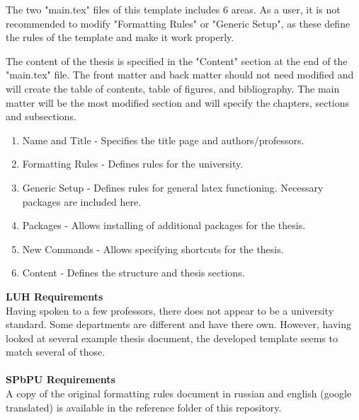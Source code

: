 \label{chap:guidelines}
The two "main.tex" files of this template includes 6 areas. As a user, it is not recommended to modify "Formatting Rules" or "Generic Setup", as these define the rules of the template and make it work properly.

The content of the thesis is specified in the "Content" section at the end of the "main.tex" file. The front matter and back matter should not need modified and will create the table of contents, table of figures, and bibliography. The main matter will be the most modified section and will specify the chapters, sections and subsections.

\begin{enumerate}
    \item Name and Title - Specifies the title page and authors/professors.
    \item Formatting Rules - Defines rules for the university.
    \item Generic Setup - Defines rules for general latex functioning. Necessary packages are included here.
    \item Packages - Allows installing of additional packages for the thesis.
    \item New Commands - Allows specifying shortcuts for the thesis.
    \item Content - Defines the structure and thesis sections.
\end{enumerate}


\textbf{LUH Requirements}\\
Having spoken to a few professors, there does not appear to be a university standard. Some departments are different and have there own. However, having looked at several example thesis document, the developed template seems to match several of those.
\\\\
\textbf{SPbPU Requirements}\\
A copy of the original formatting rules document\cite{Polytech2018} in russian and english (google translated) is available in the reference folder of this repository.
